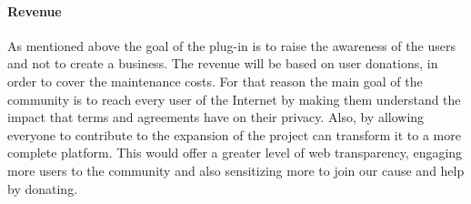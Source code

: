 \paragraph{Revenue}
As mentioned above the goal of the plug-in is to raise the awareness of the 
users and not to create a business. The revenue will be based on user donations, 
in order to cover the maintenance costs. For that reason the main goal of the 
community is to reach every user of the Internet by making them understand the 
impact that terms and agreements have on their privacy. Also, by allowing 
everyone to contribute to the expansion of the project can transform it to a 
more complete platform. This would offer a greater level of web transparency, 
engaging more users to the community and also sensitizing more to join our cause 
and help by donating.  

